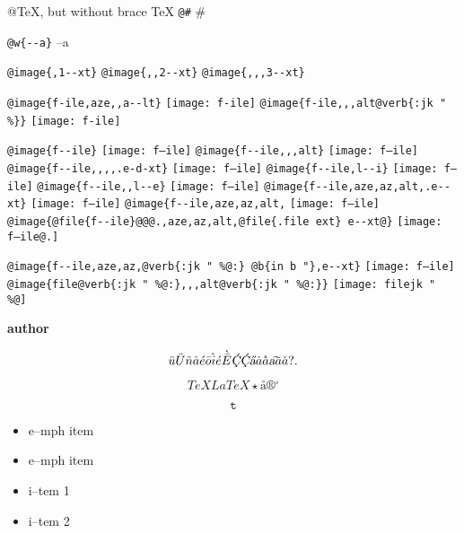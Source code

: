 \documentclass{book}
\renewcommand{\_}{\Texinfounderscore\discretionary{}{}{}}
\renewcommand{\includegraphics}[1]{\fbox{FIG \detokenize{#1}}}
\begin{document}
@TeX, but without brace \TeX{}
\texttt{@\#} \#

\texttt{@w\{{-}{-}a\}} \hbox{--a}

\texttt{@image\{,1{-}{-}xt\}} 
\texttt{@image\{{,}{,}2{-}{-}xt\}} 
\texttt{@image\{{,}{,},3{-}{-}xt\}} 

\texttt{@image\{f-ile,aze{,}{,}a{-}{-}lt\}} \texttt{[image: f-ile]}
\texttt{@image\{f-ile{,}{,},alt@verb\{:jk \_" \%\@\}\}} \texttt{[image: f-ile]}

\texttt{@image\{f{-}{-}ile\}} \texttt{[image: f--ile]}
\texttt{@image\{f{-}{-}ile{,}{,},alt\}} \texttt{[image: f--ile]}
\texttt{@image\{f{-}{-}ile{,}{,}{,}{,}.e-d-xt\}} \texttt{[image: f--ile]}
\texttt{@image\{f{-}{-}ile,l{-}{-}i\}} \texttt{[image: f--ile]}
\texttt{@image\{f{-}{-}ile{,}{,}l{-}{-}e\}} \texttt{[image: f--ile]}
\texttt{@image\{f{-}{-}ile,aze,az,alt,.e{-}{-}xt\}} \texttt{[image: f--ile]}
\texttt{@image\{f{-}{-}ile,aze,az,alt,} \texttt{[image: f--ile]}
\texttt{@image\{@file\{f{-}{-}ile\}@@@.,aze,az,alt,@file\{.file ext\}\ e{-}{-}xt@\}} \texttt{[image: f--ile@.]}

\texttt{@image\{f{-}{-}ile,aze,az,@verb\{:jk \_" \%@:\}\ @b\{in b "\},e{-}{-}xt\}} \texttt{[image: f--ile]}
\texttt{@image\{file@verb\{:jk \_" \%@:\}{,}{,},alt@verb\{:jk \_" \%@:\}\}} \texttt{[image: filejk \_" \\\%@]}


{\bfseries author}%

\[
\ddot{u} \ddot{U} \tilde{n} \hat{a} \acute{e} \bar{o} \grave{i} \acute{e} \grave{\bar{E}}
\textsl{\c{\'{C}}} \textsl{\c{\'{C}}} \textsl{\H{a}} \dot{a} \mathring{a} \textsl{\t{a}}
\breve{a} \check{a}
 ? .
\]

\[
TeX LaTeX \star{} \mathord{\text{\aa{}}} \circledR{} ^{\circ{}} 
\]

\[
\mathtt{t} 
\]

\begin{itemize}[label=\emph{}]
\item e--mph item
\end{itemize}

\begin{itemize}[label=\emph{} after emph]
\item e--mph item
\end{itemize}

\begin{itemize}[label=\textbullet{} a--n itemize line]
\item i--tem 1
\item i--tem 2
\end{itemize}
\end{document}
